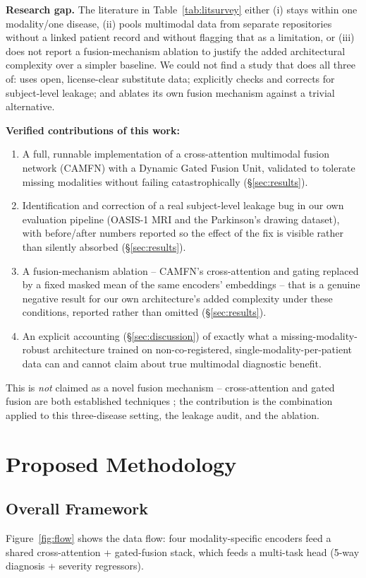 \documentclass[conference]{IEEEtran}
\begin{document}
\textbf{Research gap.} The literature in Table~\ref{tab:litsurvey}
either (i) stays within one modality/one disease, (ii) pools multimodal
data from separate repositories without a linked patient record and
without flagging that as a limitation, or (iii) does not report a
fusion-mechanism ablation to justify the added architectural complexity
over a simpler baseline. We could not find a study that does all three
of: uses open, license-clear substitute data; explicitly checks and
corrects for subject-level leakage; and ablates its own fusion mechanism
against a trivial alternative.

\textbf{Verified contributions of this work:}
\begin{enumerate}
\item A full, runnable implementation of a cross-attention multimodal
fusion network (CAMFN) with a Dynamic Gated Fusion Unit, validated to
tolerate missing modalities without failing catastrophically
(\S\ref{sec:results}).
\item Identification and correction of a real subject-level leakage bug
in our own evaluation pipeline (OASIS-1 MRI and the Parkinson's drawing
dataset), with before/after numbers reported so the effect of the fix is
visible rather than silently absorbed (\S\ref{sec:results}).
\item A fusion-mechanism ablation -- CAMFN's cross-attention and gating
replaced by a fixed masked mean of the same encoders' embeddings -- that
is a genuine negative result for our own architecture's added complexity
under these conditions, reported rather than omitted
(\S\ref{sec:results}).
\item An explicit accounting (\S\ref{sec:discussion}) of exactly what a
missing-modality-robust architecture trained on non-co-registered,
single-modality-per-patient data can and cannot claim about true
multimodal diagnostic benefit.
\end{enumerate}
This is \emph{not} claimed as a novel fusion mechanism -- cross-attention
and gated fusion are both established techniques
\cite{vaswani2017attention,hayat2022medfuse}; the contribution is the
combination applied to this three-disease setting, the leakage audit,
and the ablation.

\section{Proposed Methodology}
\label{sec:method}

\subsection{Overall Framework}
Figure~\ref{fig:flow} shows the data flow: four modality-specific
encoders feed a shared cross-attention + gated-fusion stack, which feeds
a multi-task head (5-way diagnosis + severity regressors).
\end{document}
